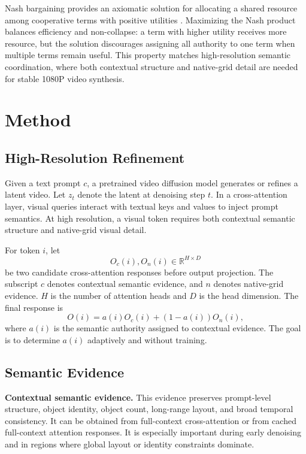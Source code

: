 \documentclass[10pt,twocolumn]{article}
\begin{document}
Nash bargaining provides an axiomatic solution for allocating a shared resource among cooperative terms with positive utilities \cite{nash1950bargaining,nash1951noncooperative}. Maximizing the Nash product balances efficiency and non-collapse: a term with higher utility receives more resource, but the solution discourages assigning all authority to one term when multiple terms remain useful. This property matches high-resolution semantic coordination, where both contextual structure and native-grid detail are needed for stable 1080P video synthesis.

\section{Method}

\subsection{High-Resolution Refinement}

Given a text prompt $c$, a pretrained video diffusion model generates or refines a latent video. Let $z_t$ denote the latent at denoising step $t$. In a cross-attention layer, visual queries interact with textual keys and values to inject prompt semantics. At high resolution, a visual token requires both contextual semantic structure and native-grid visual detail.

For token $i$, let
\begin{equation}
    O_c(i), O_n(i) \in \mathbb{R}^{H \times D}
\end{equation}
be two candidate cross-attention responses before output projection. The subscript $c$ denotes contextual semantic evidence, and $n$ denotes native-grid evidence. $H$ is the number of attention heads and $D$ is the head dimension. The final response is
\begin{equation}
    O(i)=a(i)O_c(i)+(1-a(i))O_n(i),
    \label{eq:mix}
\end{equation}
where $a(i)$ is the semantic authority assigned to contextual evidence. The goal is to determine $a(i)$ adaptively and without training.

\subsection{Semantic Evidence}

\noindent\textbf{Contextual semantic evidence.}
This evidence preserves prompt-level structure, object identity, object count, long-range layout, and broad temporal consistency. It can be obtained from full-context cross-attention or from cached full-context attention responses. It is especially important during early denoising and in regions where global layout or identity constraints dominate.
\end{document}
